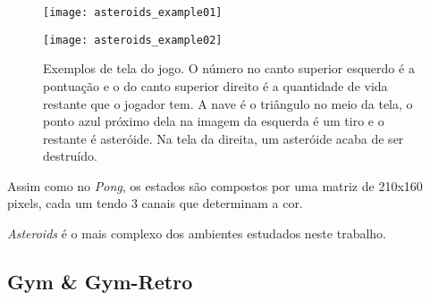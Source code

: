 \begin{figure}[h!]
  \begin{minipage}[b]{.5\textwidth}
  \centering
  \texttt{[image: asteroids\_example01]}
  \end{minipage}
  \hfill
  \begin{minipage}[b]{.5\textwidth}
  \texttt{[image: asteroids\_example02]}
  \end{minipage}
  \caption{Exemplos de tela do jogo. O número no canto superior esquerdo é a pontuação e o do canto superior direito é a quantidade de vida restante que o jogador tem. A nave é o triângulo no meio da tela, o ponto azul próximo dela na imagem da esquerda é um tiro e o restante é asteróide. Na tela da direita, um asteróide acaba de ser destruído.}
\end{figure}

Assim como no \textit{Pong}, os estados são compostos por uma matriz de 210x160 pixels, cada um tendo 3 canais que determinam a cor.

\textit{Asteroids} é o mais complexo dos ambientes estudados neste trabalho.




\subsection{Gym \& Gym-Retro}
\label{sec:gymretro}

